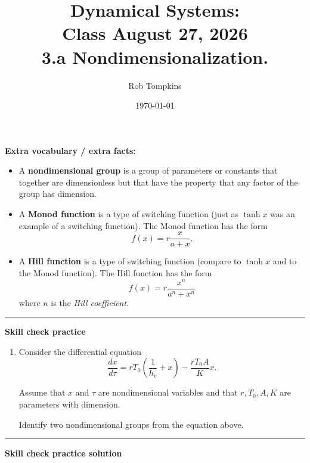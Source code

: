 \documentclass[12pt]{amsart}
\title{Dynamical Systems:\\Class August 27, 2026\\ 3.a Nondimensionalization.}
\author{Rob Tompkins}
\date{\today}
\theoremstyle{conjecture}
\theoremstyle{definition}
\theoremstyle{question}
\theoremstyle{theorem}
\newcommand{\sectionrule}{%
    \vspace{0.3em}
    \hrule
    \vspace{0.8em}
}
\begin{document}
    \maketitle

    \textbf{Extra vocabulary / extra facts:}

    \begin{tcolorbox}[
        colback=white,
        colframe=black!70,
        boxrule=0.8pt,
        arc=2mm,
        left=3mm,
        right=3mm,
        top=2mm,
        bottom=2mm
    ]
        \begin{itemize}
            \item A \textbf{nondimensional group} is a group of parameters or constants that together are
            dimensionless but that have the property that any factor of the group has dimension.

            \item A \textbf{Monod function} is a type of switching function (just as $\tanh x$ was an example of
            a switching function). The Monod function has the form
            \[
                f(x)=r\frac{x}{a+x}.
            \]

            \item A \textbf{Hill function} is a type of switching function (compare to $\tanh x$ and to the Monod
            function). The Hill function has the form
            \[
                f(x)=r\frac{x^n}{a^n+x^n}
            \]
            where $n$ is the \textit{Hill coefficient}.
        \end{itemize}
    \end{tcolorbox}

    \sectionrule

    {\Large\textbf{Skill check practice}}

    \begin{enumerate}
        \item Consider the differential equation
        \[
            \frac{dx}{d\tau}
            =
            rT_0\left(\frac{1}{h_v}+x\right)
            -
            \frac{rT_0A}{K}x.
        \]

        Assume that $x$ and $\tau$ are nondimensional variables and that $r,T_0,A,K$ are parameters with
        dimension.

        Identify two nondimensional groups from the equation above.
    \end{enumerate}

    \sectionrule

    {\Large\textbf{Skill check practice solution}}
\end{document}
